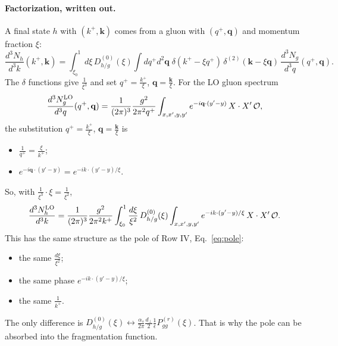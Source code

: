 \documentclass[10pt]{article}
\numberwithin{equation}{section}
\newcommand{\OO}{\mathcal O}
\newcommand{\pre}{\frac{1}{(2\pi)^3}\frac{g^2}{2\pi^2k^+}}
\begin{document}
\paragraph{Factorization, written out.} A final state $h$ with $(k^+,\mathbf k)$ comes from a gluon with $(q^+,\mathbf q)$ and momentum fraction $\xi$:
\begin{equation}
\frac{d^3N_h}{d^3k}(k^+,\mathbf k)=\int_{\xi_0}^1d\xi\,D^{(0)}_{h/g}(\xi)\int dq^+d^2\mathbf q\;\delta(k^+-\xi q^+)\,\delta^{(2)}(\mathbf k-\xi\mathbf q)\,\frac{d^3N_g}{d^3q}(q^+,\mathbf q).
\label{eq:factdef}
\end{equation}
The $\delta$ functions give $\frac{1}{\xi^3}$ and set $q^+=\frac{k^+}{\xi}$, $\mathbf q=\frac{\mathbf k}{\xi}$. For the LO gluon spectrum
\begin{equation}
\frac{d^3N^{\rm LO}_g}{d^3q}(q^+,\mathbf q)=\frac{1}{(2\pi)^3}\frac{g^2}{2\pi^2q^+}\int_{x,x',y,y'}e^{-i\mathbf q\cdot(y'-y)}\,X\cdot X'\,\OO ,
\end{equation}
the substitution $q^+=\frac{k^+}{\xi}$, $\mathbf q=\frac{\mathbf k}{\xi}$ is
\begin{itemize}
\item $\frac{1}{q^+}=\frac{\xi}{k^+}$;
\item $e^{-i\mathbf q\cdot(y'-y)}=e^{-ik\cdot(y'-y)/\xi}$.
\end{itemize}
So, with $\frac{1}{\xi^3}\cdot\xi=\frac{1}{\xi^2}$,
\begin{equation}
\frac{d^3N^{\rm LO}_h}{d^3k}=\pre\int_{\xi_0}^1\frac{d\xi}{\xi^2}\,D^{(0)}_{h/g}(\xi)\int_{x,x',y,y'}e^{-ik\cdot(y'-y)/\xi}\,X\cdot X'\,\OO .
\label{eq:fact}
\end{equation}
This has the same structure as the pole of Row IV, Eq.~\eqref{eq:pole}:
\begin{itemize}
\item the same $\frac{d\xi}{\xi^2}$;
\item the same phase $e^{-ik\cdot(y'-y)/\xi}$;
\item the same $\frac{1}{k^+}$.
\end{itemize}
The only difference is $D^{(0)}_{h/g}(\xi)\leftrightarrow\frac{\alpha_s}{2\pi}\frac{d_\perp}{2}\frac{1}{\bar\epsilon}P^{(r)}_{gg}(\xi)$. That is why the pole can be absorbed into the fragmentation function.
\end{document}
